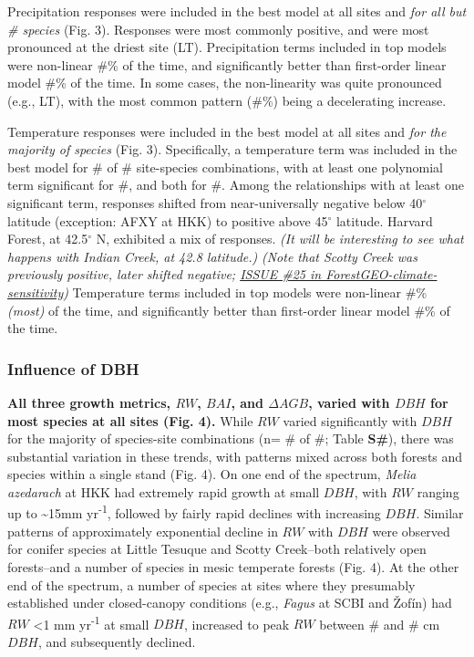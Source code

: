 \documentclass[
]{article}
\begin{document}
Precipitation responses were included in the best model at all sites and
\emph{for all but \# species} (Fig. 3). Responses were most commonly
positive, and were most pronounced at the driest site (LT).
Precipitation terms included in top models were non-linear \#\% of the
time, and significantly better than first-order linear model \#\% of the
time. In some cases, the non-linearity was quite pronounced (e.g., LT),
with the most common pattern (\#\%) being a decelerating increase.

Temperature responses were included in the best model at all sites and
\emph{for the majority of species} (Fig. 3). Specifically, a temperature
term was included in the best model for \# of \# site-species
combinations, with at least one polynomial term significant for \#, and
both for \#. Among the relationships with at least one significant term,
responses shifted from near-universally negative below 40\(^\circ\)
latitude (exception: AFXY at HKK) to positive above 45\(^\circ\)
latitude. Harvard Forest, at 42.5\(^\circ\) N, exhibited a mix of
responses. \emph{(It will be interesting to see what happens with Indian
Creek, at 42.8 latitude.)} \emph{(Note that Scotty Creek was previously
positive, later shifted negative;
\href{https://github.com/EcoClimLab/ForestGEO-climate-sensitivity/issues/25}{ISSUE
\#25 in ForestGEO-climate-sensitivity})} Temperature terms included in
top models were non-linear \#\% \emph{(most)} of the time, and
significantly better than first-order linear model \#\% of the time.

\hypertarget{influence-of-dbh}{%
\subsubsection{Influence of DBH}\label{influence-of-dbh}}

\textbf{All three growth metrics, \(RW\), \(BAI\), and \(\Delta AGB\),
varied with \(DBH\) for most species at all sites (Fig. 4).} While
\(RW\) varied significantly with \(DBH\) for the majority of
species-site combinations (n= \# of \#; Table \textbf{S\#}), there was
substantial variation in these trends, with patterns mixed across both
forests and species within a single stand (Fig. 4). On one end of the
spectrum, \emph{Melia azedarach} at HKK had extremely rapid growth at
small \(DBH\), with \(RW\) ranging up to \textasciitilde15mm
yr\textsuperscript{-1}, followed by fairly rapid declines with
increasing \(DBH\). Similar patterns of approximately exponential
decline in \(RW\) with \(DBH\) were observed for conifer species at
Little Tesuque and Scotty Creek--both relatively open forests--and a
number of species in mesic temperate forests (Fig. 4). At the other end
of the spectrum, a number of species at sites where they presumably
established under closed-canopy conditions (e.g., \emph{Fagus} at SCBI
and Žofín) had \(RW\) \textless1 mm yr\textsuperscript{-1} at small
\(DBH\), increased to peak \(RW\) between \# and \# cm \(DBH\), and
subsequently declined.
\end{document}
